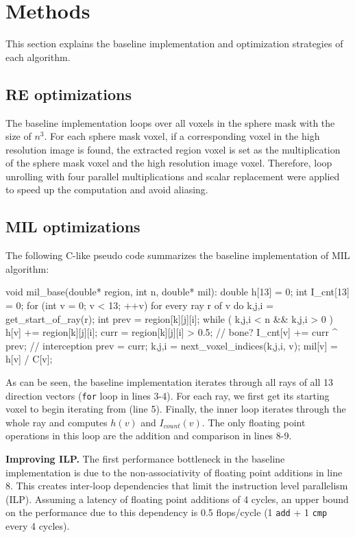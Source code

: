 \documentclass[letterpaper]{article}
\newcommand{\mypar}[1]{{\bf #1.}}
\begin{document}
\section{Methods}\label{sec:yourmethod}
This section explains the baseline implementation and optimization strategies of each algorithm.

\subsection{RE optimizations} The baseline implementation loops over all voxels in the sphere mask with the size of $n^{3}$. For each sphere mask voxel, if a corresponding voxel in the high resolution image is found, the extracted region voxel is set as the multiplication of the sphere mask voxel and the high resolution image voxel. Therefore, loop unrolling with four parallel multiplications and scalar replacement were applied to speed up the computation and avoid aliasing. 

\subsection{MIL optimizations}
The following C-like pseudo code summarizes the baseline implementation of MIL algorithm:

\begin{ccode}[caption={My Caption},captionpos=b]
void mil_base(double* region, int n, double* mil):
  double h[13] = 0; int I_cnt[13] = 0;
  for (int v = 0; v < 13; ++v)
    for every ray r of v  do
      {k,j,i} = get_start_of_ray(r);
      int prev = region[k][j][i];
      while ( {k,j,i} < n && {k,j,i} > 0 )
        h[v] += region[k][j][i];
        curr = region[k][j][i] > 0.5; // bone?
        I_cnt[v] += curr ^ prev; // interception
        prev = curr;
        {k,j,i} = next_voxel_indices({k,j,i}, v);
    mil[v] = h[v] / C[v];
\end{ccode}
As can be seen, the baseline implementation iterates through all rays of all 13 direction vectors (\texttt{for} loop in lines 3-4). For each ray, we first get its starting voxel to begin iterating from (line 5). Finally, the inner loop iterates through the whole ray and computes $h(v)$ and $I_{count}(v)$. The only floating point operations in this loop are the addition and comparison in lines 8-9.

\mypar{Improving ILP}
The first performance bottleneck in the baseline implementation is due to the non-associativity of floating point additions in line 8. This creates inter-loop dependencies that limit the instruction level parallelism (ILP). Assuming a latency of floating point additions of 4 cycles, an upper bound on the performance due to this dependency is 0.5 flops/cycle (1 \texttt{add} + 1 \texttt{cmp} every 4 cycles).
\end{document}
